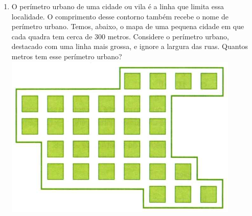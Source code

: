 \documentclass[a4paper,14pt]{article}
\begin{document}
\begin{multicols}{2}
\begin{enumerate}
			\item O perímetro urbano de uma cidade ou vila é a linha que limita essa localidade. O comprimento desse contorno também recebe o nome de perímetro urbano. Temos, abaixo, o mapa de uma pequena cidade em que cada quadra tem cerca de 300 metros. Considere o perímetro urbano, destacado com uma linha mais grossa, e ignore a largura das ruas. Quantos metros tem esse perímetro urbano?
			\includegraphics[width=1\linewidth]{6FMA28_imagens/imagem5}
		\end{enumerate}
		$~$ \\ $~$ \\ $~$ \\ $~$ \\ $~$ \\ $~$ \\
	\end{multicols}
\end{document}
